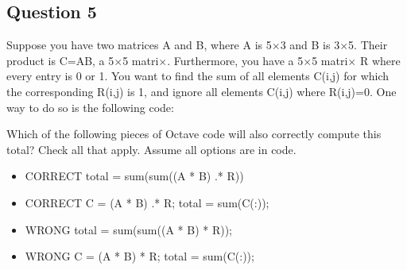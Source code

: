 \documentclass[11pt]{article} %
\begin{document}

\subsection*{Question 5 } 

Suppose you have two matrices A and B, where A is 5$ \times $3 and B is 3$ \times $5. Their product is C=AB, a 5$ \times $5 matri$ \times $. Furthermore, you have a 5$ \times $5 matri$ \times $ R where every entry is 0 or 1. You want to find the sum of all elements C(i,j) for which the corresponding R(i,j) is 1, and ignore all elements C(i,j) where R(i,j)=0. One way to do so is the following code:


Which of the following pieces of Octave code will also correctly compute this total? Check all that apply. Assume all options are in code.

\begin{itemize}

\item CORRECT total = sum(sum((A * B) .* R))

\item CORRECT C = (A * B) .* R; total = sum(C(:));

\item WRONG total = sum(sum((A * B) * R));

\item WRONG C = (A * B) * R; total = sum(C(:));
\end{itemize}
\end{document}
